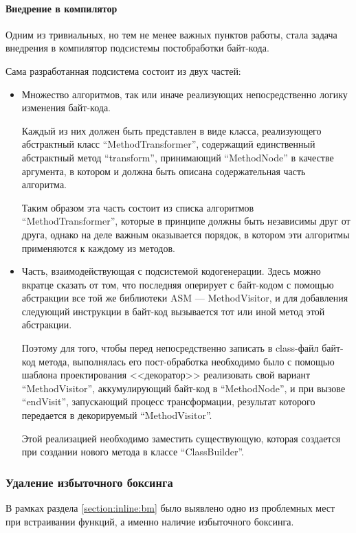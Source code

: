 \paragraph{Внедрение в компилятор}
Одним из тривиальных, но тем не менее важных пунктов работы, стала задача внедрения в компилятор
подсистемы постобработки байт-кода.

Сама разработанная подсистема состоит из двух частей:
\begin{itemize}
    \item Множество алгоритмов, так или иначе реализующих непосредственно логику изменения
    байт-кода.

    Каждый из них должен быть представлен в виде класса, реализующего абстрактный класс
    ``MethodTransformer'', содержащий единственный абстрактный метод ``transform'', принимающий
    ``MethodNode'' в качестве аргумента, в котором и должна быть описана содержательная часть
    алгоритма.

    Таким образом эта часть состоит из списка алгоритмов ``MethodTransformer'', которые в принципе
    должны быть независимы друг от друга, однако на деле важным оказывается порядок, в котором
    эти алгоритмы применяются к каждому из методов.

    \item Часть, взаимодействующая с подсистемой кодогенерации.
    Здесь можно вкратце сказать от том, что последняя оперирует с байт-кодом с помощью абстракции
    все той же библиотеки ASM --- MethodVisitor, и для добавления следующий инструкции в байт-код
    вызывается тот или иной метод этой абстракции.

    Поэтому для того, чтобы перед непосредственно записать в class-файл байт-код метода,
    выполнялась его пост-обработка необходимо было с помощью шаблона проектирования
    <<декоратор>>\cite{Gamma} реализовать свой вариант ``MethodVisitor'', аккумулирующий байт-код
    в ``MethodNode'', и при вызове ``endVisit'', запускающий процесс трансформации, результат
    которого передается в декорируемый ``MethodVisitor''.

    Этой реализацией необходимо заместить существующую, которая создается при создании нового метода
    в классе ``ClassBuilder''.
\end{itemize}

\subsubsection{Удаление избыточного боксинга}
\label{section:boxing}
В рамках раздела \ref{section:inline:bm} было выявлено одно из проблемных мест при встраивании
функций, а именно наличие избыточного боксинга.

